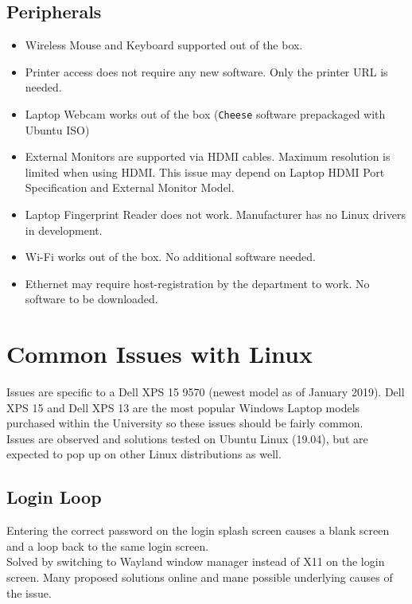 \documentclass[10pt,letterpaper,twocolumn]{article}
\begin{document}
\subsection{Peripherals}

\begin{itemize}
	\item Wireless Mouse and Keyboard supported out of the box.
	\item Printer access does not require any new software. Only the printer URL is needed.
	\item Laptop Webcam works out of the box (\texttt{Cheese} software prepackaged with Ubuntu ISO)
	\item External Monitors are supported via HDMI cables. Maximum resolution is limited when using HDMI. This issue may depend on Laptop HDMI Port Specification and External Monitor Model.
	\item Laptop Fingerprint Reader does not work. Manufacturer has no Linux drivers in development.
	\item Wi-Fi works out of the box. No additional software needed.
	\item Ethernet may require host-registration by the department to work. No software to be downloaded.
\end{itemize}

\newpage

\section{Common Issues with Linux}

Issues are specific to a Dell XPS 15 9570 (newest model as of January 2019). Dell XPS 15 and Dell XPS 13 are the most popular Windows Laptop models purchased within the University so these issues should be fairly common. \\

Issues are observed and solutions tested on Ubuntu Linux (19.04), but are expected to pop up on other Linux distributions as well.

\subsection{Login Loop}

Entering the correct password on the login splash screen causes a blank screen and a loop back to the same login screen.\\

Solved by switching to Wayland window manager instead of X11 on the login screen. Many proposed solutions online and mane possible underlying causes of the issue. 
\end{document}
